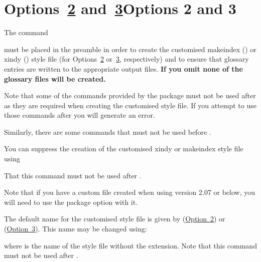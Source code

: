 \documentclass[report,inlinetitle]{nlctdoc}
\newcommand*{\opt}[1]{\hyperlink{option#1}{Option~#1}}
\newcommand*{\optsor}[2]{Options~\hyperlink{option#1}{#1}
or~\hyperlink{option#2}{#2}}
\newcommand*{\optsand}[2]{Options~\hyperlink{option#1}{#1}
and~\hyperlink{option#2}{#2}}
\begin{document}
\section[Options 2 and 3]{\ifpdf\optsand23\else Options 2 and 3\fi}
\label{sec:setupopt23}

The command
\begin{definition}[\DescribeMacro{\makeglossaries}]
\end{definition}
must be placed in the preamble in order to create the customised
\gls{makeindex} () or \gls{xindy} ()
style file (for \optsor23, respectively) and to ensure that glossary 
entries are written to the appropriate output files. 
\textbf{If you omit  none of
the glossary files will be created.}

\begin{important}
Note that some of the commands provided by the 
package must not be used after  as they are
required when creating the customised style file. If you attempt
to use those commands after  you will generate
an error.

Similarly, there are some commands that must not be used before
.
\end{important}

You can suppress the creation of the customised \gls{xindy}
or \gls{makeindex} style file using
\begin{definition}[\DescribeMacro{\noist}]
\end{definition}
That this command must not be used after .
\begin{important}
Note that if you have a custom  file created when using 
 version 2.07 or below, you will need to use the
 package option with it.
\end{important}

The default name for the customised style file is given by
 (\opt2) or 
 (\opt3). This name may be
changed using:
\begin{definition}[\DescribeMacro{\setStyleFile}]
\end{definition}
where  is the name of the style file without the 
extension. Note that this command must not be used after
.
\end{document}
